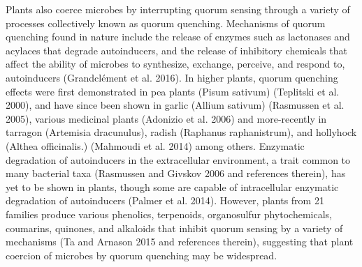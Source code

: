 \documentclass[PhD]{msu-thesis}
\begin{document}
Plants also coerce microbes by interrupting quorum sensing through a variety of processes collectively known as quorum quenching. Mechanisms of quorum quenching found in nature include the release of enzymes such as lactonases and acylaces that degrade autoinducers, and the release of inhibitory chemicals that affect the ability of microbes to synthesize, exchange, perceive, and respond to, autoinducers (Grandclément et al. 2016). In higher plants, quorum quenching effects were first demonstrated in pea plants (Pisum sativum)  (Teplitski et al. 2000), and have since been shown in garlic (Allium sativum) (Rasmussen et al. 2005), various medicinal plants (Adonizio et al. 2006) and more-recently in tarragon (Artemisia dracunulus), radish (Raphanus raphanistrum), and hollyhock (Althea officinalis.) (Mahmoudi et al. 2014) among others. Enzymatic degradation of autoinducers in the extracellular environment, a trait common to many bacterial taxa (Rasmussen and Givskov 2006 and references therein), has yet to be shown in plants, though some are capable of intracellular enzymatic degradation of autoinducers (Palmer et al. 2014). However, plants from 21 families produce various phenolics, terpenoids, organosulfur phytochemicals, coumarins, quinones, and alkaloids that inhibit quorum sensing by a variety of mechanisms (Ta and Arnason 2015 and references therein), suggesting that plant coercion of microbes by quorum quenching may be widespread.
\end{document}
